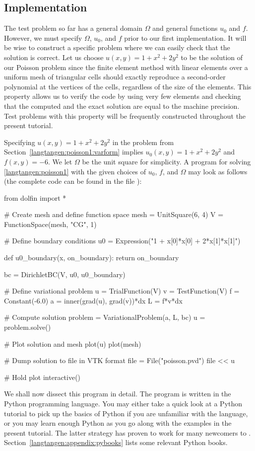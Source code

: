 \subsection{Implementation}
\label{langtangen:poisson1:impl}

The test problem so far has a general domain $\Omega$ and general
functions $u_0$ and $f$. However, we must specify $\Omega$, $u_0$, and
$f$ prior to our first implementation.  It will be wise to construct a
specific problem where we can easily check that the solution is correct.
Let us choose $u(x,y)=1 + x^2 + 2y^2$ to be the solution of our Poisson
problem since the finite element method with linear elements over a
uniform mesh of triangular cells should exactly reproduce a second-order
polynomial at the vertices of the cells, regardless of the size of
the elements. This property allows us to verify the code by using very
few elements and checking that the computed and the exact solution are
equal to the machine precision.  Test problems with this property will
be frequently constructed throughout the present tutorial.

Specifying $u(x,y)=1 + x^2 + 2y^2$ in the problem from
Section~\ref{langtangen:poisson1:varform} implies $u_0(x,y)= 1 + x^2 +
2y^2$ and $f(x,y)=-6$.  We let $\Omega$ be the unit square for simplicity.
A \fenics{} program for solving \eqref{langtangen:poisson1} with the
given choices of $u_0$, $f$, and $\Omega$ may look as follows (the
complete code can be found in the file ):
\begin{python}
from dolfin import *

# Create mesh and define function space
mesh = UnitSquare(6, 4)
V = FunctionSpace(mesh, "CG", 1)

# Define boundary conditions
u0 = Expression("1 + x[0]*x[0] + 2*x[1]*x[1]")

def u0_boundary(x, on_boundary):
    return on_boundary

bc = DirichletBC(V, u0, u0_boundary)

# Define variational problem
u = TrialFunction(V)
v = TestFunction(V)
f = Constant(-6.0)
a = inner(grad(u), grad(v))*dx
L = f*v*dx

# Compute solution
problem = VariationalProblem(a, L, bc)
u = problem.solve()

# Plot solution and mesh
plot(u)
plot(mesh)

# Dump solution to file in VTK format
file = File("poisson.pvd")
file << u

# Hold plot
interactive()
\end{python}
We shall now dissect this \fenics{} program in detail. The program
is written in the Python programming language.  You may either take a
quick look at a Python tutorial \citep{PythonTutorial} to pick up the
basics of Python if you are unfamiliar with the language, or you may
learn enough Python as you go along with the examples in the present
tutorial. The latter strategy has proven to work for many newcomers
to \fenics.
Section~\ref{langtangen:appendix:pybooks} lists some relevant Python
books.

